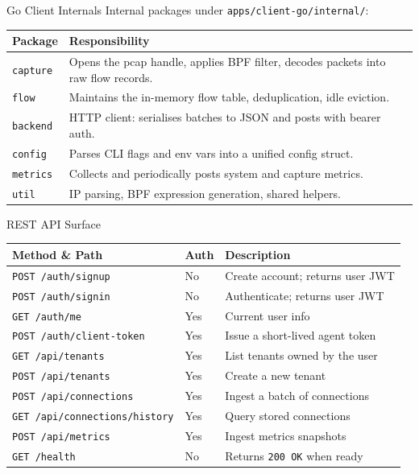 \documentclass[aspectratio=169]{beamer}
\begin{document}
\begin{frame}{Go Client Internals}
    Internal packages under \texttt{apps/client-go/internal/}:
    \vspace{0.2cm}
    \begin{center}
    \small
    \begin{tabular}{lp{8cm}}
        \toprule
        \textbf{Package}  & \textbf{Responsibility} \\ \midrule
        \texttt{capture}  & Opens the pcap handle, applies BPF filter, decodes packets
                            into raw flow records. \\
        \texttt{flow}     & Maintains the in-memory flow table, deduplication, idle eviction. \\
        \texttt{backend}  & HTTP client: serialises batches to JSON and posts with bearer auth. \\
        \texttt{config}   & Parses CLI flags and env vars into a unified config struct. \\
        \texttt{metrics}  & Collects and periodically posts system and capture metrics. \\
        \texttt{util}     & IP parsing, BPF expression generation, shared helpers. \\ \bottomrule
    \end{tabular}
    \end{center}
\end{frame}

\begin{frame}{REST API Surface}
    \begin{center}
    \small
    \begin{tabular}{llp{5.5cm}}
        \toprule
        \textbf{Method \& Path}         & \textbf{Auth} & \textbf{Description} \\ \midrule
        \texttt{POST /auth/signup}       & No  & Create account; returns user JWT \\
        \texttt{POST /auth/signin}       & No  & Authenticate; returns user JWT \\
        \texttt{GET  /auth/me}           & Yes & Current user info \\
        \texttt{POST /auth/client-token} & Yes & Issue a short-lived agent token \\
        \texttt{GET  /api/tenants}       & Yes & List tenants owned by the user \\
        \texttt{POST /api/tenants}       & Yes & Create a new tenant \\
        \texttt{POST /api/connections}   & Yes & Ingest a batch of connections \\
        \texttt{GET  /api/connections/history} & Yes & Query stored connections \\
        \texttt{POST /api/metrics}       & Yes & Ingest metrics snapshots \\
        \texttt{GET  /health}            & No  & Returns \texttt{200 OK} when ready \\ \bottomrule
    \end{tabular}
    \end{center}
\end{frame}
\end{document}
